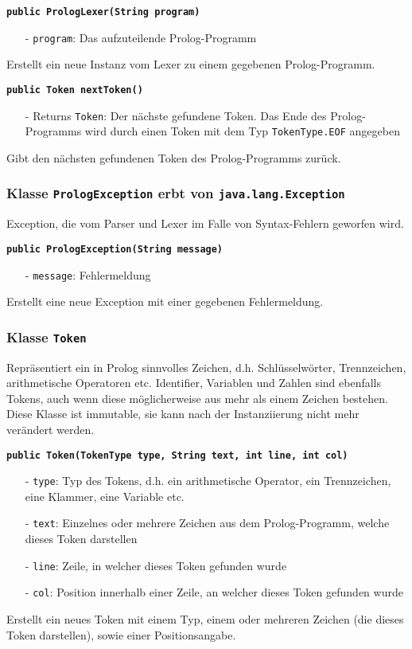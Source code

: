 \documentclass[parskip=full,11pt,twoside]{scrartcl}
\begin{document}
\textbf{\texttt{public PrologLexer(String program)}}
\begin{itemize}[noitemsep]
	\item[-] \texttt{program}: Das aufzuteilende Prolog-Programm
\end{itemize}
Erstellt ein neue Instanz vom Lexer zu einem gegebenen Prolog-Programm.

\textbf{\texttt{public Token nextToken()}}
\begin{itemize}[noitemsep]
	\item[-] Returns \texttt{Token}: Der nächste gefundene Token. Das Ende des Prolog-Programms wird durch einen Token mit dem Typ \texttt{TokenType.EOF} angegeben
\end{itemize}
Gibt den nächsten gefundenen Token des Prolog-Programms zurück.

\subsubsection{Klasse \texttt{PrologException} erbt von \texttt{java.lang.Exception}}

Exception, die vom Parser und Lexer im Falle von Syntax-Fehlern geworfen wird.

\textbf{\texttt{public PrologException(String message)}}
\begin{itemize}[noitemsep]
	\item[-] \texttt{message}: Fehlermeldung
\end{itemize}
Erstellt eine neue Exception mit einer gegebenen Fehlermeldung.

\subsubsection{Klasse \texttt{Token}}

Repräsentiert ein in Prolog sinnvolles Zeichen, d.h. Schlüsselwörter, Trennzeichen, arithmetische Operatoren etc. Identifier, Variablen und Zahlen sind ebenfalls Tokens, auch wenn diese möglicherweise aus mehr als einem Zeichen bestehen. Diese Klasse ist immutable, sie kann nach der Instanziierung nicht mehr verändert werden.

\textbf{\texttt{public Token(TokenType type, String text, int line, int col)}}
\begin{itemize}[noitemsep]
	\item[-] \texttt{type}: Typ des Tokens, d.h. ein arithmetische Operator, ein Trennzeichen, eine Klammer, eine Variable etc.
	\item[-] \texttt{text}: Einzelnes oder mehrere Zeichen aus dem Prolog-Programm, welche dieses Token darstellen
	\item[-] \texttt{line}: Zeile, in welcher dieses Token gefunden wurde
	\item[-] \texttt{col}: Position innerhalb einer Zeile, an welcher dieses Token gefunden wurde
\end{itemize}
Erstellt ein neues Token mit einem Typ, einem oder mehreren Zeichen (die dieses Token darstellen), sowie einer Positionsangabe.
\end{document}
